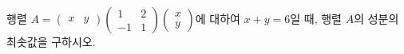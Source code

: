 \hspace*{2mm}\begin{minipage}[t]{\dimexpr\linewidth-2mm\relax}\vspace{0pt}
행렬 $A=\begin{pmatrix} x & y \end{pmatrix}\begin{pmatrix} 1 & 2 \\ -1 & 1 \end{pmatrix}\begin{pmatrix} x \\ y \end{pmatrix}$에 대하여 $x+y=6$일 때, 행렬 $A$의 성분의 최솟값을 구하시오. \end{minipage}
